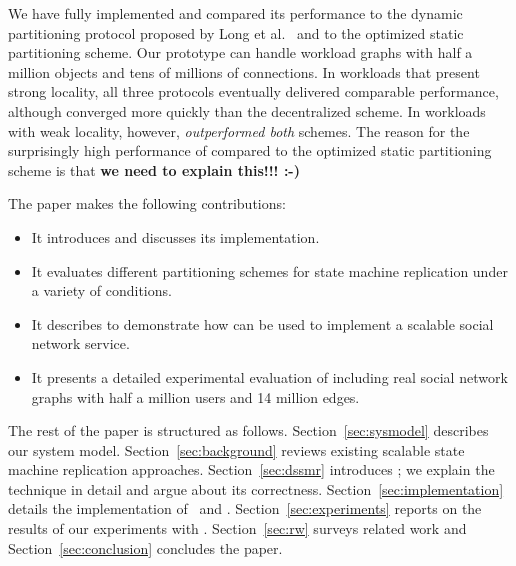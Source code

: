 



%

\smallskip

We have fully implemented \dynastar and compared its performance to
the dynamic partitioning protocol proposed by Long et
al.~\cite{hoang2016} and to the optimized static partitioning scheme.
Our prototype can handle workload graphs with half a million objects
and tens of millions of connections.  In workloads that present strong
locality, all three protocols eventually delivered comparable
performance, although \dynastar converged more quickly than the
decentralized scheme.  In workloads with weak locality, however,
\dynastar \emph{outperformed both} schemes.  The reason for the
surprisingly high performance of \dynastar compared to the optimized
static partitioning scheme is that \textbf{we need to explain this!!!
  :-)}

The paper makes the following contributions:
\begin{itemize}
\item It introduces \dynastar and discusses its implementation. 
\item It evaluates different partitioning schemes for state machine replication under a variety of conditions.
\item It describes \appname{} to demonstrate how \libname{} can be used to implement a scalable social network service.
\item It presents a detailed experimental evaluation of \dynastar including real social network graphs with half a million users and 14 million edges.
\end{itemize}

The rest of the paper is structured as follows.
Section~\ref{sec:sysmodel} describes our system model.
Section~\ref{sec:background} reviews existing scalable state machine replication approaches.
Section~\ref{sec:dssmr} introduces \dssmr{}; we explain the technique in detail and argue about its correctness.
Section~\ref{sec:implementation} details the implementation of \libname\ and \appname{}.
Section~\ref{sec:experiments} reports on the results of our experiments with \dssmr{}.
Section~\ref{sec:rw} surveys related work and
Section~\ref{sec:conclusion} concludes the paper.




